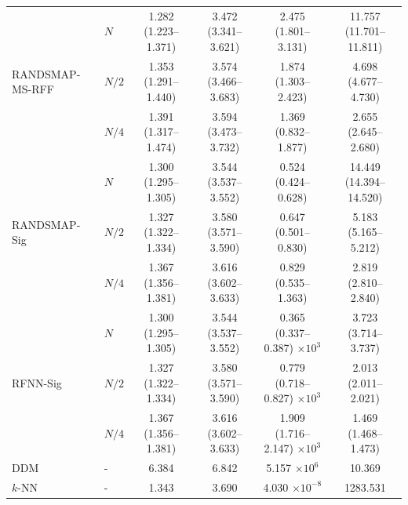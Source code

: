 \documentclass{article}
\begin{document}
\begin{table}[htbp]
{\begin{tabular}{@{}llcccc@{}}
\multirow{3}{*}{RANDSMAP-MS-RFF} 
&	$N$	     & 1.282 (1.223--1.371) & 3.472 (3.341--3.621) & 2.475 (1.801--3.131) & 11.757 (11.701--11.811) \\
&	$N/2$	 & 1.353 (1.291--1.440) & 3.574 (3.466--3.683) & 1.874 (1.303--2.423) & 4.698 (4.677--4.730)    \\
&	$N/4$	 & 1.391 (1.317--1.474) & 3.594 (3.473--3.732) & 1.369 (0.832--1.877) & 2.655 (2.645--2.680)    \\
\midrule

\multirow{3}{*}{RANDSMAP-Sig} 
&	$N$	    & 1.300 (1.295--1.305) & 3.544 (3.537--3.552) & 0.524 (0.424--0.628) & 14.449 (14.394--14.520) \\
&	$N/2$	& 1.327 (1.322--1.334) & 3.580 (3.571--3.590) & 0.647 (0.501--0.830) & 5.183 (5.165--5.212)    \\
&	$N/4$	& 1.367 (1.356--1.381) & 3.616 (3.602--3.633) & 0.829 (0.535--1.363) & 2.819 (2.810--2.840)    \\
\midrule

\multirow{3}{*}{RFNN-Sig} 
&	$N$	    & 1.300 (1.295--1.305) & 3.544 (3.537--3.552) & 0.365 (0.337--0.387) $\times 10^{3}$ & 3.723 (3.714--3.737) \\
&	$N/2$	& 1.327 (1.322--1.334) & 3.580 (3.571--3.590) & 0.779 (0.718--0.827) $\times 10^{3}$ & 2.013 (2.011--2.021) \\
&	$N/4$	& 1.367 (1.356--1.381) & 3.616 (3.602--3.633) & 1.909 (1.716--2.147) $\times 10^{3}$ & 1.469 (1.468--1.473) \\
\midrule

DDM  &	-	& 6.384 & 6.842 & 5.157 $\times 10^{6}$ & 10.369 \\
$k$-NN &	-	& 1.343 & 3.690 & 4.030 $\times 10^{-8}$ & 1283.531 \\

\bottomrule
\end{tabular}%
}
\end{table}
\end{document}
